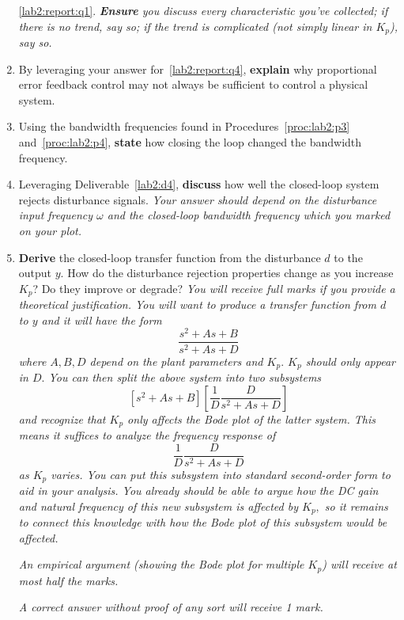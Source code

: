 \begin{deliverable}[label={lab2:report}]
\begin{enumerate}[label={(\arabic*)}]
{      \ref{lab2:report:q1}.
      \emph{\textbf{Ensure} you discuss every characteristic
      you've collected; if there is no trend, say so; if the trend is
      complicated (not simply linear in \(K_p\)), say so.}
      \label{lab2:report:q4}
    }
    \item{
      By leveraging your answer for~\ref{lab2:report:q4}, \textbf{explain} why
      proportional error feedback control may not always be sufficient to
      control a physical system.
      \label{lab2:report:q4b}
    }
    \item{
      Using the bandwidth frequencies found in Procedures~\ref{proc:lab2:p3}
      and~\ref{proc:lab2:p4}, \textbf{state} how closing the loop
      changed the bandwidth frequency.
      \label{lab2:report:q5}
    }
    \item{
      Leveraging Deliverable~\ref{lab2:d4}, \textbf{discuss} how well the
      closed-loop system rejects disturbance signals.
      \emph{Your answer should depend on the disturbance input frequency
      \(\omega\) and the closed-loop bandwidth frequency which you marked
      on your plot.}
      \label{lab2:report:q6}
    }
    \item{
      \textbf{Derive} the closed-loop transfer function from the
      disturbance \(d\) to the output \(y.\) How do the disturbance rejection
      properties change as you increase \(K_p\)? Do they improve or degrade?
      \emph{You will receive full marks if you provide a theoretical
      justification. You will want to produce a transfer function from
      \(d\) to \(y\) 
      and it will have the form
      \[
        \frac{s^2 + A s + B}{s^2 + A s + D}
      \]
      where \(A, B, D\) depend on the plant parameters and \(K_p.\)
      \(K_p\) should only appear in \(D.\) You can then split the
      above system into two subsystems
      \[
        \left[s^2 + A s + B\right]
        \left[\frac{1}{D}\frac{D}{s^2 + A s + D}\right]
      \]
      and recognize that \(K_p\) only affects the Bode plot of the latter
      system. This means it suffices to analyze the frequency response of
      \[
        \frac{1}{D}\frac{D}{s^2 + A s + D}
      \]
      as \(K_p\) varies. You can put this subsystem into standard second-order
      form to aid in your analysis. You already should be able to argue how the
      DC gain and natural frequency of this new subsystem is affected by
      \(K_p,\) so it remains to connect this knowledge with how the Bode plot
      of this subsystem would be affected.}

      \emph{An empirical argument (showing the Bode plot for multiple \(K_p\))
      will receive at most half the marks.}

      \emph{A correct answer without proof of any sort will receive 1 mark.}
      \label{lab2:report:q8}
    }
  \end{enumerate}
\end{deliverable}

